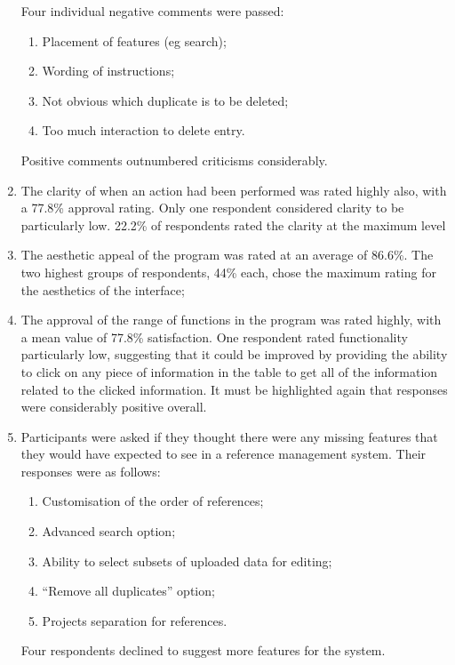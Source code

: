 \begin{enumerate}
	Four individual negative comments were passed:
	\begin{enumerate}
		\item Placement of features (eg search);
		\item Wording of instructions;
		\item Not obvious which duplicate is to be deleted;
		\item Too much interaction to delete entry.
	\end{enumerate}
	
	Positive comments outnumbered criticisms considerably.
	
	\item The clarity of when an action had been performed was rated highly also, with a 77.8\% approval rating. Only one respondent considered clarity to be particularly low. 22.2\% of respondents rated the clarity at the maximum level
	
	\item The aesthetic appeal of the program was rated at an average of 86.6\%. The two highest groups of respondents, 44\% each, chose the maximum rating for the aesthetics of the interface; 
	
	\item The approval of the range of functions in the program was rated highly, with a mean value of 77.8\% satisfaction.  One respondent rated functionality particularly low, suggesting that it could be improved by providing the ability to click on any piece of information in the table to get all of the information related to the clicked information.  It must be highlighted again that responses were considerably positive overall.
	
	\item Participants were asked if they thought there were any missing features that they would have expected to see in a reference management system. Their responses were as follows:
	\begin{enumerate}
		\item Customisation of the order of references;
		\item Advanced search option;
		\item Ability to select subsets of uploaded data for editing;
		\item ``Remove all duplicates'' option;
		\item Projects separation for references.
	\end{enumerate}
	Four respondents declined to suggest more features for the system.
	

\end{enumerate}
